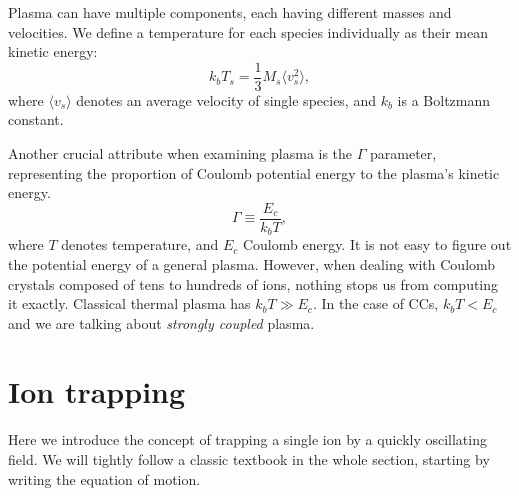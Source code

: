 Plasma can have multiple components, each having different masses and velocities. We define a temperature \cite{fitzpatrick2014plasma} for each species individually as their mean kinetic energy:
\begin{equation}
	\label{temperature}
	k_b T_s = \frac{1}{3} M_s \langle v_s^2 \rangle,
\end{equation}
where $\langle v_s \rangle$ denotes an average velocity of single species, and $k_b$ is a Boltzmann constant.

Another crucial attribute when examining plasma is the $\Gamma$ parameter, representing the proportion of Coulomb potential energy to the plasma's kinetic energy.
\begin{equation}
	\label{gamma def}
	\Gamma \equiv \frac{E_c}{k_b T},
\end{equation}
where $T$ denotes temperature, and $E_c$ Coulomb energy. It is not easy to figure out the potential energy of a general plasma. However, when dealing with Coulomb crystals composed of tens to hundreds of ions, nothing stops us from computing it exactly. Classical thermal plasma has $k_b T \gg E_c$. In the case of CCs, $k_b T < E_c$ and we are talking about \emph{strongly coupled} plasma.

\section{Ion trapping}
Here we introduce the concept of trapping a single ion by a quickly oscillating field. We will tightly follow a classic textbook \cite{gerlich1992inhomogeneous} in the whole section, starting by writing the equation of motion.

